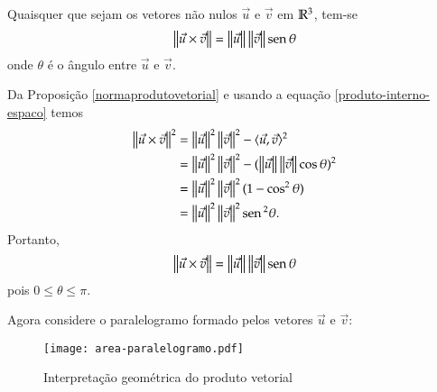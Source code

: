 \begin{proposicao}
  Quaisquer que sejam os vetores n\~ao nulos $\vec{u}$ e $\vec{v}$ em $\mathbb{R}^3$, tem-se
  \[
    \left\Vert{\vec{u}\times\vec{v}}\right\Vert = \left\Vert{\vec{u}}\right\Vert\left\Vert{\vec{v}}\right\Vert{\rm sen\,}\theta
  \]
  onde $\theta$ \'e o \^angulo entre $\vec{u}$ e $\vec{v}$.
\end{proposicao}
\begin{prova}
  Da Proposi\c{c}\~ao \ref{normaprodutovetorial}  e usando a equa\c{c}\~ao \eqref{produto-interno-espaco} temos
  \begin{align*}
    \left\Vert{\vec{u}\times\vec{v}}\right\Vert^2 &= \left\Vert{\vec{u}}\right\Vert^2\left\Vert{\vec{v}}\right\Vert^2 - \langle \vec{u}, \vec{v} \rangle^2\\ &= \left\Vert{\vec{u}}\right\Vert^2\left\Vert{\vec{v}}\right\Vert^2 - (\left\Vert{\vec{u}}\right\Vert\left\Vert{\vec{v}}\right\Vert\cos\theta)^2\\ &= \left\Vert{\vec{u}}\right\Vert^2\left\Vert{\vec{v}}\right\Vert^2(1 - \cos^2\theta)\\ &= \left\Vert{\vec{u}}\right\Vert^2\left\Vert{\vec{v}}\right\Vert^2{\rm sen\,}^2\theta.
  \end{align*}
  Portanto,
  \[
    \left\Vert{\vec{u}\times\vec{v}}\right\Vert = \left\Vert{\vec{u}}\right\Vert\left\Vert{\vec{v}}\right\Vert{\rm sen\,}\theta
  \]
  pois $0 \le \theta \le \pi$.
\end{prova}

Agora considere o paralelogramo formado pelos vetores $\vec{u}$ e $\vec{v}$:
\begin{figure}[!h]
  \centering
  \caption{Interpreta\c{c}\~ao geom\'etrica do produto vetorial}
  \texttt{[image: area-paralelogramo.pdf]}





\end{figure}

